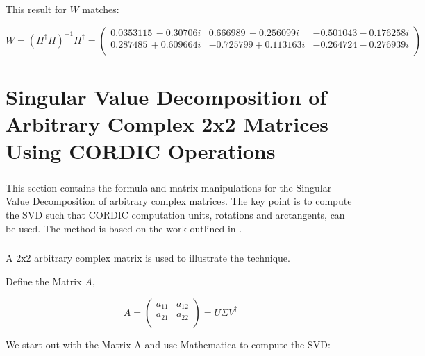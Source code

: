 This result for $W$ matches:

\begin{equation}
W=(H^{\dagger} H)^{-1}H^{\dagger}=\left(
\begin{array}{ccc}
 0.0353115\, -0.30706 i & 0.666989\, +0.256099 i & -0.501043-0.176258 i \\
 0.287485\, +0.609664 i & -0.725799+0.113163 i & -0.264724-0.276939 i \\
\end{array}
\right)
\end{equation}




\chapter{Singular Value Decomposition of Arbitrary Complex 2x2 Matrices Using CORDIC Operations}
\paragraph{}
This section contains  the formula and matrix manipulations for the Singular Value Decomposition of arbitrary complex matrices. The key point is to compute the SVD such that CORDIC computation units, rotations and arctangents, can be used. The method is based on the work outlined in \cite{Hemkumar}.

\paragraph{}
A 2x2 arbitrary complex matrix is used to illustrate the technique.

Define the Matrix $A$,

\begin{equation}\label{test}
    A= \left(
         \begin{array}{cc}
           a_{11} & a_{12} \\
           a_{21} & a_{22} \\
         \end{array}
       \right)
    =U \Sigma V^\dag
\end{equation}

We start out with the Matrix A and use  Mathematica to compute the SVD:


